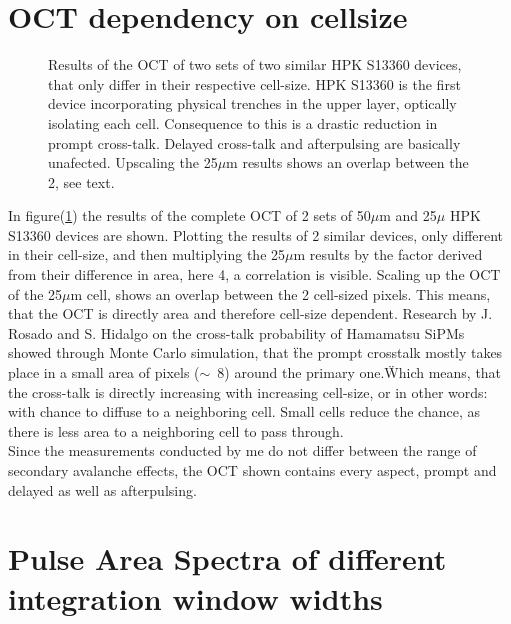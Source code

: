 \documentclass[12pt,article,type=msc,colorback,accentcolor=tud9c]{tudthesis}
\begin{document}
\clearpage
\section{OCT dependency on cellsize}
\label{appsec:OCT_Size}
\begin{figure}[h]
\begin{centering}
\caption[OCT dependency on the cell-size]{Results of the OCT of two sets of two similar HPK S13360 devices, that only differ in their respective cell-size. HPK S13360 is the first device incorporating physical trenches in the upper layer, optically isolating each cell. Consequence to this is a drastic reduction in prompt cross-talk. Delayed cross-talk and afterpulsing are basically unafected. Upscaling the 25$\mu$m results shows an overlap between the 2, see text.}
\label{fig:cell-size}
\end{centering}
\end{figure}
In figure(\ref{fig:cell-size}) the results of the complete OCT of 2 sets of 50$\mu$m and 25$\mu$ HPK S13360 devices are shown. Plotting the results of 2 similar devices, only different in their cell-size, and then multiplying the 25$\mu$m results by the factor derived from their difference in area, here 4, a correlation is visible. Scaling up the OCT of the 25$\mu$m cell, shows an overlap between the 2 cell-sized pixels. This means, that the OCT is directly area and therefore cell-size dependent. Research by J. Rosado and S. Hidalgo \cite{ModelCTAP} on the cross-talk probability of Hamamatsu SiPMs showed through Monte Carlo simulation, that \"the prompt crosstalk mostly takes place in a small area of pixels ($\sim$~8) around the primary one.\" Which means, that the cross-talk is directly increasing with increasing cell-size, or in other words: with chance to diffuse to a neighboring cell. Small cells reduce the chance, as there is less area to a neighboring cell to pass through.\\
Since the measurements conducted by me do not differ between the range of secondary avalanche effects, the OCT shown contains every aspect, prompt and delayed as well as afterpulsing.

\clearpage
\section{Pulse Area Spectra of different integration window widths}
\label{appsec:PAS_window}
\end{document}
